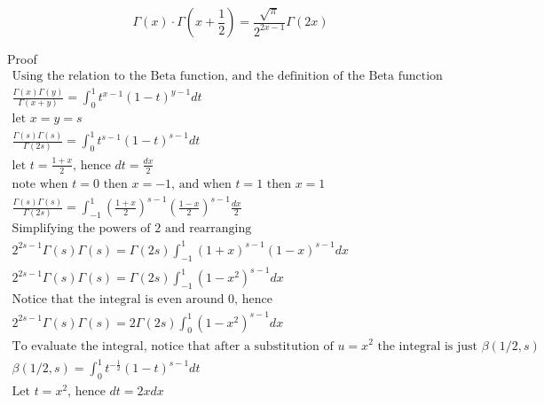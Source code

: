 \documentclass[a4paper]{article}
\begin{document}
    \begin{theorem}
        \begin{equation}
            \boxed{
                \Gamma(x) \cdot \Gamma(x+\frac{1}{2}) = \frac{\sqrt{\pi}}{2^{2x - 1}} \Gamma(2x)
            }\label{gf:eq:equation26}
        \end{equation}

        Proof
        \\
        \begin{gather*}
            \text{Using the relation to the Beta function, and the definition of the Beta function}
            \\
            \frac{\Gamma(x) \Gamma(y)}{\Gamma(x+y)} =
            \int_{0}^{1} t^{x-1} (1-t)^{y-1} dt
            \\
            \text{let $x=y=s$}
            \\
            \frac{\Gamma(s) \Gamma(s)}{\Gamma(2s)} =
            \int_{0}^{1} t^{s-1} (1-t)^{s-1} dt
            \\
            \text{let $t = \frac{1+x}{2}$, hence $dt = \frac{dx}{2}$}
            \\
            \text{note when $t=0$ then $x=-1$, and when $t=1$ then $x=1$}
            \\
            \frac{\Gamma(s) \Gamma(s)}{\Gamma(2s)} =
            \int_{-1}^{1} (\frac{1+x}{2})^{s-1} (\frac{1-x}{2})^{s-1} \frac{dx}{2}
            \\
            \text{Simplifying the powers of 2 and rearranging}
            \\
            2^{2s -1} \Gamma(s) \Gamma(s)= \Gamma(2s)
            \int_{-1}^{1} (1+x)^{s-1} (1-x)^{s-1} dx
            \\
            2^{2s -1} \Gamma(s) \Gamma(s)=
            \Gamma(2s) \int_{-1}^{1} (1-x^2)^{s-1} dx
            \\
            \text{Notice that the integral is even around 0, hence}
            \\
            2^{2s -1} \Gamma(s) \Gamma(s)=
            2 \Gamma(2s) \int_{0}^{1} (1-x^2)^{s-1} dx
            \\
            \text{To evaluate the integral, notice that after a substitution of $u=x^2$ the integral is just $\beta(1/2, s)$}
            \\
            \beta(1/2, s) = \int_{0}^{1} t^{-\frac{1}{2}} (1-t)^{s-1} dt
            \\
            \text{Let $t=x^2$, hence $dt = 2x dx$}
            \\

\end{gather*}
\end{theorem}
\end{document}
